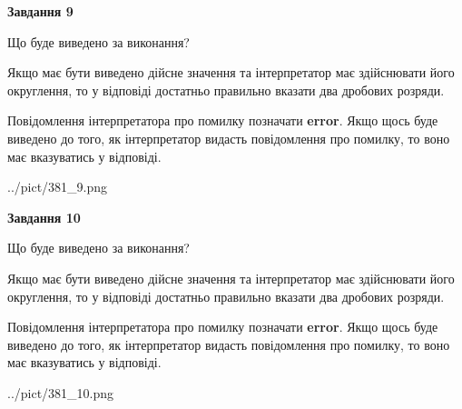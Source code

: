 \documentclass[12pt, ukrainian]{article}
\begin{document}
{\begin {Large}
{\begin {center}\textbf{Завдання 9}\end {center}}\par
Що буде виведено за виконання? \par

Якщо має бути виведено дійсне значення та інтерпретатор має здійснювати його округлення, 
то у відповіді достатньо правильно вказати два дробових розряди.

Повідомлення інтерпретатора про помилку позначати \textbf{error}.
Якщо щось буде виведено до того, як інтерпретатор видасть повідомлення про помилку, 
то воно має вказуватись у відповіді. \par

\begin{center}
	{../pict/381_9.png}
\end{center}
\newpage

{\begin {center}\textbf{Завдання 10}\end {center}}\par
Що буде виведено за виконання? \par

Якщо має бути виведено дійсне значення та інтерпретатор має здійснювати його округлення, 
то у відповіді достатньо правильно вказати два дробових розряди.

Повідомлення інтерпретатора про помилку позначати \textbf{error}.
Якщо щось буде виведено до того, як інтерпретатор видасть повідомлення про помилку, 
то воно має вказуватись у відповіді. \par

\begin{center}
	{../pict/381_10.png}
\end{center}
\newpage

\end {Large}}
\end{document}
